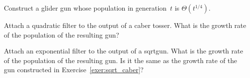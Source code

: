 \begin{multicols}{2}
	
	
	\mfilbreak
	
	
	\begin{problem}\label{exer:fourth_root_gun} 
		Construct a glider gun whose population in generation~$t$ is $\Theta(t^{1/4})$.
	\end{problem}
	
	
	\mfilbreak
	
	
	\begin{problem}\label{exer:sqrt_caber} 
		Attach a quadratic filter to the output of a caber tosser. What is the growth rate of the population of the resulting gun?
	\end{problem}
	
	
	\mfilbreak
	
	
	\begin{problem}\label{exer:exp_filter_sqrtgun} 
		Attach an exponential filter to the output of a sqrtgun. What is the growth rate of the population of the resulting gun. Is it the same as the growth rate of the gun constructed in Exercise~\ref{exer:sqrt_caber}?
		

\end{problem}
\end{multicols}
